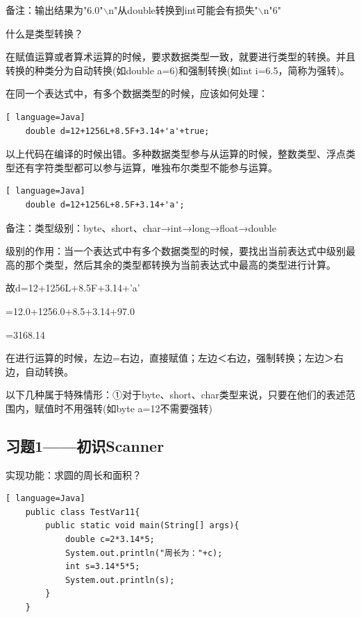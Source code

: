 \documentclass{article}
\begin{document}
	备注：输出结果为"6.0"$\backslash$n"从double转换到int可能会有损失"$\backslash$n"6"
	
	\bigskip
	
	什么是类型转换？
	
	在赋值运算或者算术运算的时候，要求数据类型一致，就要进行类型的转换。并且转换的种类分为自动转换(如double a=6)和强制转换(如int i=6.5，简称为强转)。
	
	在同一个表达式中，有多个数据类型的时候，应该如何处理：
	
	\begin{lstlisting}[ language=Java]
	double d=12+1256L+8.5F+3.14+'a'+true;
	\end{lstlisting}
	
	以上代码在编译的时候出错。多种数据类型参与从运算的时候，整数类型、浮点类型还有字符类型都可以参与运算，唯独布尔类型不能参与运算。
	
	\begin{lstlisting}[ language=Java]
	double d=12+1256L+8.5F+3.14+'a';
	\end{lstlisting}
	
	备注：类型级别：byte、short、char→int→long→float→double
	
	\setlength{\parindent}{5em}级别的作用：当一个表达式中有多个数据类型的时候，要找出当前表达式中级别最高的那个类型，然后其余的类型都转换为当前表达式中最高的类型进行计算。
	
	故d=12+1256L+8.5F+3.14+'a'
	
	\setlength{\parindent}{7em}=12.0+1256.0+8.5+3.14+97.0
	
	=3168.14
	
	\setlength{\parindent}{5em}在进行运算的时候，左边=右边，直接赋值；左边＜右边，强制转换；左边＞右边，自动转换。
	
	以下几种属于特殊情形：①对于byte、short、char类型来说，只要在他们的表述范围内，赋值时不用强转(如byte a=12不需要强转)
	
	\setlength{\parindent}{2em}
	
	\subsection{习题1——初识Scanner} 
	
	实现功能：求圆的周长和面积？
	
	\begin{lstlisting}[ language=Java]
	public class TestVar11{
		public static void main(String[] args){
			double c=2*3.14*5;	
			System.out.println("周长为："+c);
			int s=3.14*5*5;
			System.out.println(s);
		}
	}
	\end{lstlisting}
	
\end{document}
